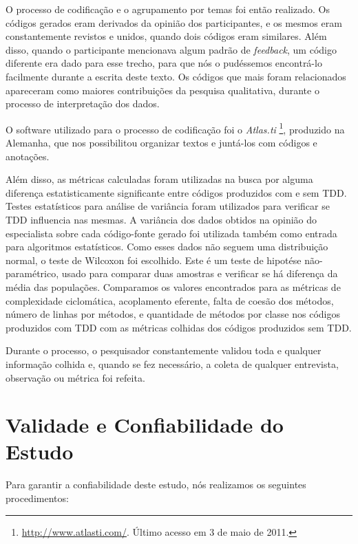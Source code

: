 O processo de codificação e o agrupamento por temas foi então realizado. 
Os códigos gerados eram derivados da opinião dos participantes, e os mesmos 
eram constantemente revistos e unidos, quando dois códigos eram similares.
Além disso, quando o participante mencionava algum padrão de \textit{feedback},
um código diferente era dado para esse trecho, para que nós o pudéssemos encontrá-lo
facilmente durante a escrita deste texto.
Os códigos que mais foram relacionados apareceram como maiores
contribuições da pesquisa qualitativa, durante o processo de interpretação dos
dados. 

O software utilizado para o processo de codificação foi
o \textit{Atlas.ti} \footnote{\url{http://www.atlasti.com/}. Último acesso em 3
de maio de 2011.}, produzido na Alemanha, que nos possibilitou 
organizar textos e juntá-los com códigos e anotações. 

Além disso, as métricas calculadas foram utilizadas na busca por alguma diferença
estatisticamente significante entre códigos produzidos com e sem TDD. 
Testes estatísticos para análise de variância foram utilizados
para verificar se TDD influencia nas mesmas.
A variância dos dados obtidos na opinião do especialista sobre cada código-fonte gerado
foi utilizada também como entrada para algoritmos estatísticos. 
Como esses dados não seguem uma distribuição normal, o teste
de Wilcoxon foi escolhido. Este é um teste de hipotése não-paramétrico,
usado para comparar duas amostras e verificar se há diferença da média das populações.
Comparamos os valores encontrados
para as métricas de complexidade ciclomática, acoplamento eferente, falta
de coesão dos métodos, número de linhas por métodos, e quantidade de métodos
por classe nos códigos produzidos com TDD com as métricas colhidas dos
códigos produzidos sem TDD.

Durante o processo, o pesquisador constantemente validou toda e qualquer
informação colhida e, quando se fez necessário, a coleta de qualquer entrevista,
observação ou métrica foi refeita. 

\section{Validade e Confiabilidade do Estudo}
\label{sec:planejamento-validacao}

Para garantir a confiabilidade deste estudo, nós realizamos os
seguintes procedimentos:


